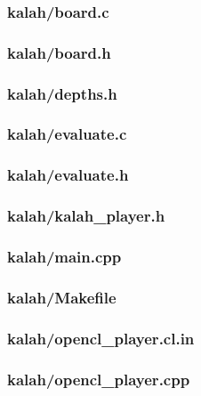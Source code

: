 \documentclass{article}
\begin{document}
\subsubsection*{kalah/board.c}


\subsubsection*{kalah/board.h}


\subsubsection*{kalah/depths.h}


\subsubsection*{kalah/evaluate.c}


\subsubsection*{kalah/evaluate.h}


\subsubsection*{kalah/kalah\_player.h}


\subsubsection*{kalah/main.cpp}


\subsubsection*{kalah/Makefile}


\subsubsection*{kalah/opencl\_player.cl.in}


\subsubsection*{kalah/opencl\_player.cpp}

\end{document}
